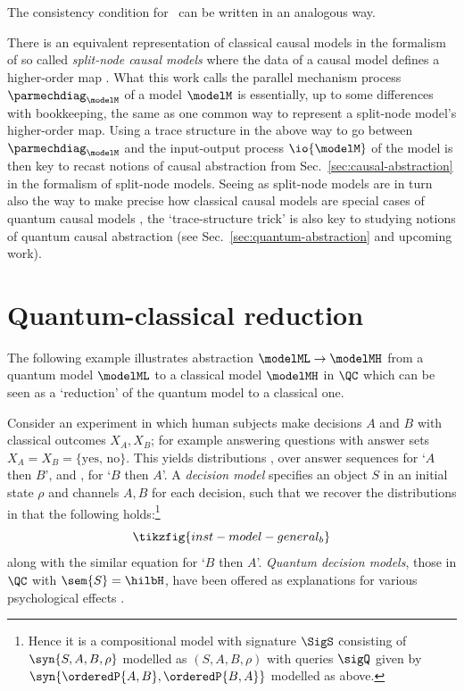 \documentclass{article}
\begin{document}
{The consistency condition for \isointabs\ can be written in an analogous way. 

\begin{remark} \label{rem:trace-trick-for-HO}
	There is an equivalent representation of classical causal models in the formalism of so called \emph{split-node causal models} where the data of a causal model defines a higher-order map \cite{barrett2019quantum, lorenz2023causal}. 
	What this work calls the parallel mechanism process $\parmechdiag_\modelM$ of a model $\modelM$ is essentially, up to some differences with bookkeeping, the same as one common way to represent a split-node model's   higher-order map. 
	Using a trace structure in the above way to go between $\parmechdiag_\modelM$ and the input-output process $\io{\modelM}$ of the model is then key to recast notions of causal abstraction from Sec.~\ref{sec:causal-abstraction} in the formalism of split-node models. 
	Seeing as split-node models are in turn also the way to make precise how classical causal models are special cases of quantum causal models \cite{barrett2019quantum}, the `trace-structure trick' is also key to studying notions of quantum causal abstraction (see Sec.~\ref{sec:quantum-abstraction} and upcoming work). 
\end{remark}

\color{black}


\section{Quantum-classical reduction} \label{app:q-abs}

The following example illustrates abstraction $\modelML \to \modelMH$ from a quantum model $\modelML$ to a classical model $\modelMH$ in $\QC$ which can be seen as a `reduction' of the quantum model to a classical one.

\begin{example} \label{ex:quant-dec-model}
\cite{QCog} Consider an experiment in which human subjects make decisions $A$ and $B$ with classical outcomes $X_A, X_B$; for example answering questions with answer sets $X_A=X_B=\{\text{yes, no}\}$. This yields distributions , over answer sequences for `$A$ then $B$', and , for `$B$ then $A$'. A \emph{decision model} specifies an object $S$ in an initial state $\rho$ and channels $A, B$ for each decision, such that we recover the distributions in that the following holds:\footnote{Hence it is a compositional model with signature $\SigS$ consisting of $\syn{S, A, B, \rho}$ modelled as $(S, A ,B ,\rho)$ with queries $\sigQ$ given by $\syn{\orderedP{A,B}, \orderedP{B,A}}$ modelled as above.}
\[
\tikzfig{inst-model-general_b}
\]
along with the similar equation for `$B$ then $A$'. \emph{Quantum decision models}, those in $\QC$ with $\sem{S} = \hilbH$, have been offered as explanations for various psychological effects \cite{QCog}. 


\end{example}}
\end{document}
